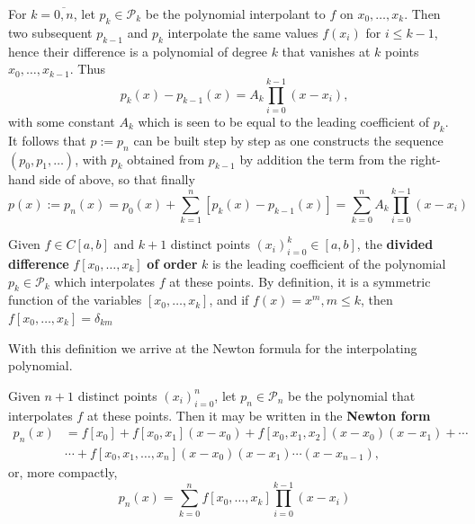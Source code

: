 \documentclass[a4paper]{article}
\begin{document}
\begin{method}
    For $k=\overline{0,n}$, let $p_{k} \in \mathcal{P}_{k}$ be the polynomial interpolant to $f$ on $x_{0}, \ldots, x_{k}$. Then two subsequent $p_{k-1}$ and $p_{k}$ interpolate the same values $f(x_{i})$ for $i \leq k-1$, hence their difference is a polynomial of degree $k$ that vanishes at $k$ points $x_{0}, \ldots, x_{k-1}$. Thus
    \begin{equation}\label{eqn:Newton 1}
        p_{k}(x)-p_{k-1}(x)=A_{k} \prod_{i=0}^{k-1}(x-x_{i}),
    \end{equation}
    with some constant $A_{k}$ which is seen to be equal to the leading coefficient of $p_{k}$. It follows that $p:=p_{n}$ can be built step by step as one constructs the sequence $(p_{0}, p_{1}, \ldots)$, with $p_{k}$ obtained from $p_{k-1}$ by addition the term from the right-hand side of above, so that finally
    $$
    p(x):=p_{n}(x)=p_{0}(x)+\sum_{k=1}^{n}[p_{k}(x)-p_{k-1}(x)]=\sum_{k=0}^{n} A_{k} \prod_{i=0}^{k-1}(x-x_{i})
    $$
\end{method}
\begin{definition}
    Given $f \in C[a, b]$ and $k+1$ distinct points $(x_{i})_{i=0}^{k} \in[a, b]$, the \textbf{divided difference} $f[x_{0}, \ldots, x_{k}]$ \textbf{of order} $k$ is the leading coefficient of the polynomial $p_{k} \in \mathcal{P}_{k}$ which interpolates $f$ at these points. By definition, it is a symmetric function of the variables $[x_{0}, \ldots, x_{k}]$, and if $f(x)=x^{m}, m \leq k$, then $f[x_{0}, \ldots, x_{k}]=\delta_{k m}$
\end{definition}
With this definition we arrive at the Newton formula for the interpolating polynomial.
\begin{theorem}
    Given $n+1$ distinct points $(x_{i})_{i=0}^{n}$, let $p_{n} \in \mathcal{P}_{n}$ be the polynomial that interpolates $f$ at these points. Then it may be written in the \textbf{Newton form}
   \begin{align*}
    p_{n}(x)&=f[x_{0}]+f[x_{0}, x_{1}](x-x_{0})+f[x_{0}, x_{1}, x_{2}](x-x_{0})(x-x_{1})+\cdots \\
    &\cdots+f[x_{0}, x_{1}, \ldots, x_{n}](x-x_{0})(x-x_{1}) \cdots(x-x_{n-1}),
   \end{align*}
   or, more compactly,
   \begin{equation}\label{eqn:Divided difference}
    p_{n}(x)=\sum_{k=0}^{n} f[x_{0}, \ldots, x_{k}] \prod_{i=0}^{k-1}(x-x_{i})
   \end{equation}
\end{theorem}
\end{document}
